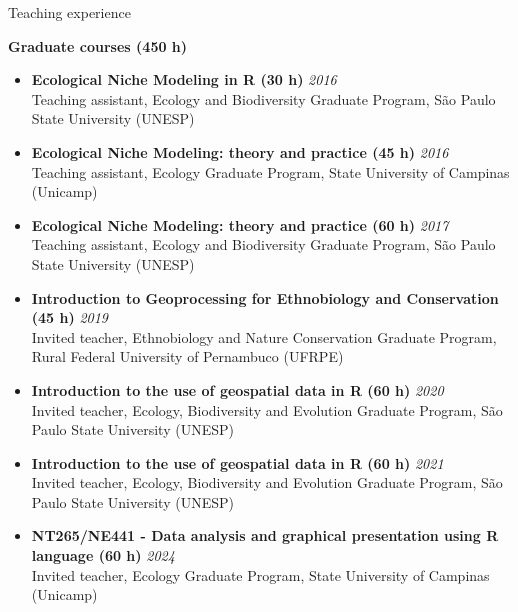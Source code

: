 \documentclass{resume}
\begin{document}

\begin{rSection}{Teaching experience}

\textbf{Graduate courses (450 h)}
\begin{itemize} 
\item \textbf{Ecological Niche Modeling in R (30 h)} \hfill{\em 2016}\\
Teaching assistant, Ecology and Biodiversity Graduate Program, São Paulo State University (UNESP)

\item \textbf{Ecological Niche Modeling: theory and practice (45 h)} \hfill{\em 2016}\\
Teaching assistant, Ecology Graduate Program, State University of Campinas (Unicamp)

\item \textbf{Ecological Niche Modeling: theory and practice (60 h)} \hfill{\em 2017}\\
Teaching assistant, Ecology and Biodiversity Graduate Program, São Paulo State University (UNESP)

\item \textbf{Introduction to Geoprocessing for Ethnobiology and Conservation (45 h)} \hfill{\em 2019}\\
Invited teacher, Ethnobiology and Nature Conservation Graduate Program, Rural Federal University of Pernambuco (UFRPE)

\item \textbf{Introduction to the use of geospatial data in R (60 h)} \hfill{\em 2020}\\
Invited teacher, Ecology, Biodiversity and Evolution Graduate Program, São Paulo State University (UNESP)

\item \textbf{Introduction to the use of geospatial data in R (60 h)} \hfill{\em 2021}\\
Invited teacher, Ecology, Biodiversity and Evolution Graduate Program, São Paulo State University (UNESP)

\item \textbf{NT265/NE441 - Data analysis and graphical presentation using R language (60 h)} \hfill{\em 2024}\\
Invited teacher, Ecology Graduate Program, State University of Campinas (Unicamp)


\end{itemize}
\end{rSection}
\end{document}
